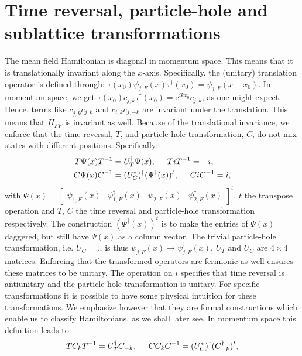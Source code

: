 \section{Time reversal, particle-hole and sublattice transformations}
\label{sec.SymmetriesTRandPH}
The mean field Hamiltonian is diagonal in momentum space. This means that it is translationally invariant along the $x$-axis. Specifically, the (unitary) translation operator is defined through: $\tau(x_0)\psi_{j,F}(x)\tau^\dagger (x_0) = \psi_{j,F}(x + x_0)$. In momentum space, we get $\tau(x_0) c_{j,k} \tau^\dagger(x_0) = \text{e}^{ikx_0}c_{j,k}$, as one might expect. Hence, terms like $c^\dagger_{j,k} c_{j,k}$ and $c_{i,k}c_{j,-k}$ are invariant under the translation. This means that $H_{FF}$ is invariant as well. Because of the translational invariance, we enforce that the time reversal, $T$, and particle-hole transformation, $C$, do not mix states with different positions. Specifically:
\begin{align}
T \Psi(x) T^{-1} &= U^\dagger_T \Psi(x), \hspace{0.5cm} TiT^{-1} = -i, \nonumber \\
C \Psi(x) C^{-1} &= (U^*_C)^\dagger (\Psi^\dagger(x))^t, \hspace{0.5cm} CiC^{-1} = i, 
\label{eq.TRandPH.realspace}
\end{align}
with $\Psi(x) = \begin{bmatrix} \psi_{1,F}(x) & \psi^\dagger_{1,F}(x) & \psi_{2,F}(x) & \psi^\dagger_{2,F}(x) \end{bmatrix}^t$, $t$ the transpose operation and $T$, $C$ the time reversal and particle-hole transformation respectively. The construction $(\Psi^\dagger(x))^t$ is to make the entries of $\Psi(x)$ daggered, but still have $\Psi(x)$ as a column vector. The trivial particle-hole transformation, i.e. $U_C = \mathbb{I}$, is thus $\psi_{j,F}(x) \to \psi^\dagger_{j,F}(x)$. $U_T$ and $U_C$ are $4\times 4$ matrices. Enforcing that the transformed operators are fermionic as well ensures these matrices to be unitary. The operation on $i$ specifies that time reversal is antiunitary and the particle-hole transformation is unitary. For specific transformations it is possible to have some physical intuition for these transformations. We emphasize however that they are formal constructions which enable us to classify Hamiltonians, as we shall later see. In momentum space this definition leads to:
\begin{equation}
T C_k T^{-1} = U^\dagger_T C_{-k}, \hspace{0.5cm} C C_k C^{-1} = (U^*_C)^\dagger (C^\dagger_{-k})^t,  
\label{eq.TRandPH.momentumspace}
\end{equation}

